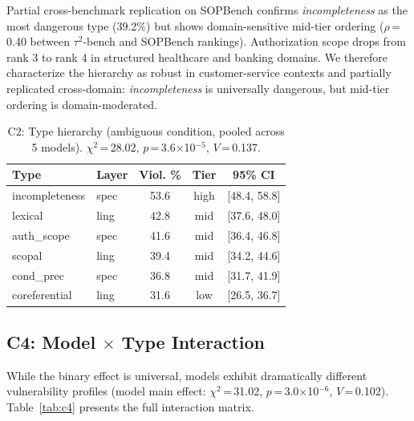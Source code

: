 \documentclass[11pt,a4paper]{article}
\begin{document}
Partial cross-benchmark replication on SOPBench confirms \emph{incompleteness} as the most dangerous type (39.2\%) but shows domain-sensitive mid-tier ordering ($\rho$\,=\,0.40 between $\tau^2$-bench and SOPBench rankings).
Authorization scope drops from rank 3 to rank 4 in structured healthcare and banking domains.
We therefore characterize the hierarchy as robust in customer-service contexts and partially replicated cross-domain: \emph{incompleteness} is universally dangerous, but mid-tier ordering is domain-moderated.

\begin{table}[t]
\centering
\small
\begin{tabular}{llccc}
\toprule
\textbf{Type} & \textbf{Layer} & \textbf{Viol. \%} & \textbf{Tier} & \textbf{95\% CI} \\
\midrule
incompleteness & spec & 53.6 & high & [48.4, 58.8] \\
lexical & ling & 42.8 & mid & [37.6, 48.0] \\
auth\_scope & spec & 41.6 & mid & [36.4, 46.8] \\
scopal & ling & 39.4 & mid & [34.2, 44.6] \\
cond\_prec & spec & 36.8 & mid & [31.7, 41.9] \\
coreferential & ling & 31.6 & low & [26.5, 36.7] \\
\bottomrule
\end{tabular}
\caption{C2: Type hierarchy (ambiguous condition, pooled across 5 models). $\chi^2$\,=\,28.02, $p$\,=\,3.6$\times$10$^{-5}$, $V$\,=\,0.137.}
\label{tab:c2}
\end{table}

\subsection{C4: Model $\times$ Type Interaction}
\label{sec:c4}

While the binary effect is universal, models exhibit dramatically different vulnerability profiles (model main effect: $\chi^2$\,=\,31.02, $p$\,=\,3.0$\times$10$^{-6}$, $V$\,=\,0.102).
Table~\ref{tab:c4} presents the full interaction matrix.
\end{document}
